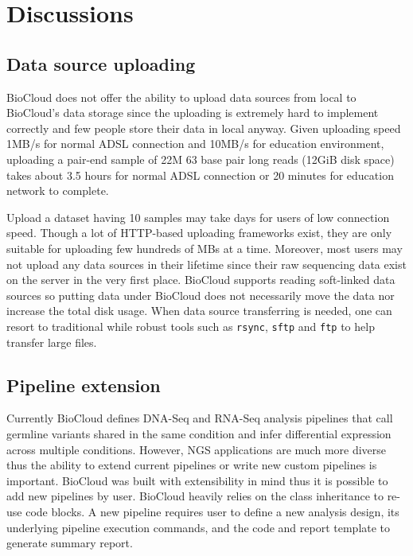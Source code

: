 \chapter{Discussions}
\label{c:discussion}


\section{Data source uploading}

BioCloud does not offer the ability to upload data sources from local to
BioCloud's data storage since the uploading is extremely hard to implement
correctly and few people store their data in local anyway. Given uploading
speed 1MB/s for normal ADSL connection and 10MB/s for education environment,
uploading a pair-end sample of 22M 63 base pair long reads (12GiB disk space)
takes about 3.5 hours for normal ADSL connection or 20 minutes for education
network to complete.

Upload a dataset having 10 samples may take days for users of low connection
speed. Though a lot of HTTP-based uploading frameworks exist, they are only
suitable for uploading few hundreds of MBs at a time. Moreover, most users may
not upload any data sources in their lifetime since their raw sequencing data
exist on the server in the very first place. BioCloud supports reading
soft-linked data sources so putting data under BioCloud does not necessarily
move the data nor increase the total disk usage. When data source transferring
is needed, one can resort to traditional while robust tools  such as
\texttt{rsync}, \texttt{sftp} and \texttt{ftp} to help transfer large files.



\section{Pipeline extension}
\label{s:pipeline-extension}

Currently BioCloud defines DNA-Seq and RNA-Seq analysis pipelines that call
germline variants shared in the same condition and infer differential
expression across multiple conditions. However, NGS applications are much more
diverse thus the ability to extend current pipelines or write new custom
pipelines is important. BioCloud was built with extensibility in mind thus it
is possible to add new pipelines by user. BioCloud heavily relies on the class
inheritance to re-use code blocks. A new pipeline requires user to define a new
analysis design, its underlying pipeline execution commands, and the code and
report template to generate summary report.

